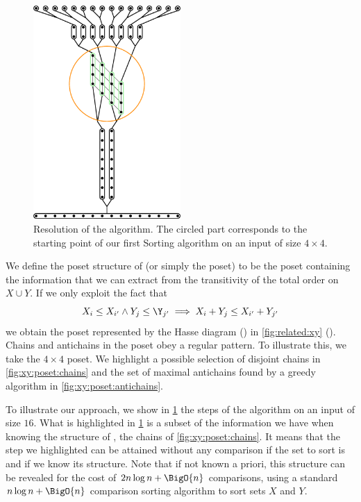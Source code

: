 \begin{figure}
\centering
\includegraphics[width=0.5\textwidth,angle=90]{fig/x+y/poset/mergexy}
\caption{Resolution of the \mergesort algorithm. The circled part
corresponds to the starting point of our first Sorting \XY algorithm on an
input of size \(4 \times 4\).}
\label{fig:xy:poset:mergexy}
\end{figure}

We define the poset structure of \XY (or simply the \XY poset) to be the poset
containing the information that we can extract from the transitivity of the
total order on \(X \cup Y\). If we only exploit the fact that
\begin{displaymath}
X_i \le X_{i'} \land Y_j \le \Y_{j'} \implies X_i + Y_j \le X_{i'} + Y_{j'}
\end{displaymath}
we obtain the poset represented by the Hasse diagram ()
in \ref{fig:related:xy} ().
Chains and antichains
in the \XY poset obey a regular pattern. To illustrate this, we take the $4 \times 4$
\XY poset. We highlight a possible selection of disjoint chains in
\ref{fig:xy:poset:chains} and the set of maximal antichains found by a greedy
algorithm in \ref{fig:xy:poset:antichains}.

To illustrate our approach, we show in \ref{fig:xy:poset:mergexy} the steps of
the \mergesort algorithm on an input of size \(16\).
What is highlighted in \ref{fig:xy:poset:mergexy} is a subset of the
information we have when knowing the structure of \XY, \ie the chains of
\ref{fig:xy:poset:chains}. It means that the step we
highlighted can be attained without any comparison if the set to sort is \XY
and if we know its structure. Note that if not known a priori, this structure
can be revealed for the cost of \(2n \log n + \BigO{n}\) comparisons, using a standard \(n
\log n + \BigO{n}\) comparison sorting algorithm to sort sets \(X\) and \(Y\).

